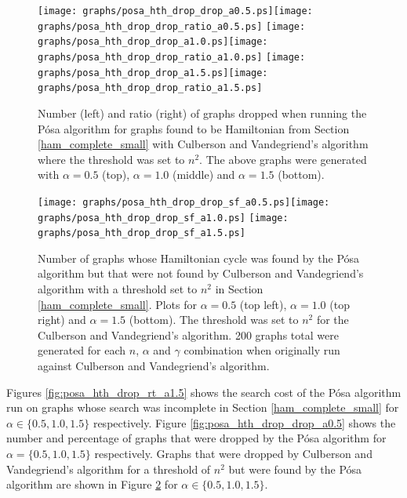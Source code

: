 \documentclass[twoside,11pt]{article}
\begin{document}
\begin{figure}
\centering
\texttt{[image: graphs/posa\_hth\_drop\_drop\_a0.5.ps]}\texttt{[image: graphs/posa\_hth\_drop\_drop\_ratio\_a0.5.ps]}
\texttt{[image: graphs/posa\_hth\_drop\_drop\_a1.0.ps]}\texttt{[image: graphs/posa\_hth\_drop\_drop\_ratio\_a1.0.ps]}
\texttt{[image: graphs/posa\_hth\_drop\_drop\_a1.5.ps]}\texttt{[image: graphs/posa\_hth\_drop\_drop\_ratio\_a1.5.ps]}

\caption{ Number (left) and ratio (right) of graphs dropped when running the P\'osa algorithm for graphs found to be Hamiltonian
from Section \ref{ham_complete_small}
with Culberson and Vandegriend's algorithm where the threshold was set to $n^2$.
The above graphs were generated with $\alpha = 0.5$ (top),  $\alpha = 1.0$ (middle) and
$\alpha = 1.5$ (bottom). }
\label{fig:posa_hth_drop_drop_a0.5}
\label{fig:posa_hth_drop_drop_a1.0}
\label{fig:posa_hth_drop_drop_a1.5}
\end{figure}


\begin{figure}
\centering
\texttt{[image: graphs/posa\_hth\_drop\_drop\_sf\_a0.5.ps]}\texttt{[image: graphs/posa\_hth\_drop\_drop\_sf\_a1.0.ps]}
\texttt{[image: graphs/posa\_hth\_drop\_drop\_sf\_a1.5.ps]}
\caption{ Number of graphs whose Hamiltonian cycle was found by the P\'osa algorithm but that were not found by
Culberson and Vandegriend's algorithm
with a threshold set to $n^2$
in Section \ref{ham_complete_small}.
Plots for $\alpha = 0.5$ (top left),  $\alpha = 1.0$ (top right) and $\alpha = 1.5$ (bottom).
The  threshold was set to $n^2$ for the Culberson and Vandegriend's algorithm.
200 graphs total were generated for each $n$, $\alpha$ and $\gamma$ combination when originally run against Culberson
and Vandegriend's algorithm. }
\label{fig:posa_hth_drop_drop_sf_a0.5}
\label{fig:posa_hth_drop_drop_sf_a1.0}
\label{fig:posa_hth_drop_drop_sf_a1.5}
\end{figure}



Figures  \ref{fig:posa_hth_drop_rt_a1.5} shows the search cost of the P\'osa
algorithm
run on graphs whose search was incomplete in Section \ref{ham_complete_small} for $\alpha \in \{ 0.5, 1.0, 1.5 \}$ respectively.
  Figure \ref{fig:posa_hth_drop_drop_a0.5} shows the number and percentage of graphs that were
dropped by the P\'osa algorithm for $\alpha = \{ 0.5, 1.0, 1.5 \}$ respectively.  Graphs that were dropped by Culberson and Vandegriend's
algorithm for a threshold of $n^2$ but were found by the P\'osa algorithm are shown in Figure
\ref{fig:posa_hth_drop_drop_sf_a1.5}
for $\alpha \in \{ 0.5, 1.0, 1.5 \}$.
\end{document}
